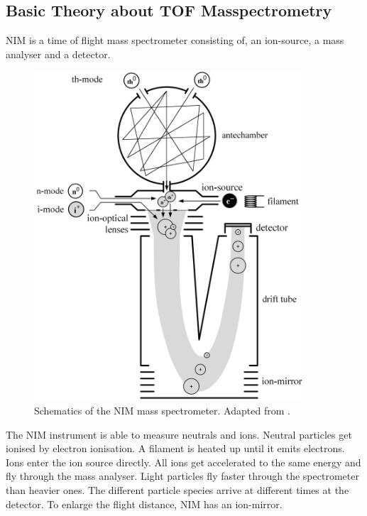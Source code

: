 	\subsection{Basic Theory about TOF Masspectrometry} %
	NIM is a time of flight mass spectrometer consisting of, an ion-source, a mass analyser and a detector.\\
	\begin{figure}[htb]
		\centering
		\includegraphics[width= 10cm]{Bilder/NIM_Sketch.png}
		\caption{Schematics of the NIM mass spectrometer. Adapted from \cite{Diss_Meyer}.}
		\label{fig:NIMSketch}
	\end{figure}
	The NIM instrument is able to measure neutrals and ions. Neutral particles get ionised by electron ionisation. A filament is heated up until it emits electrons. Ions enter the ion source directly. All ions get accelerated to the same energy and fly through the mass analyser. Light particles fly faster through the spectrometer than heavier ones. The different particle species arrive at different times at the detector. To enlarge the flight distance, NIM has an ion-mirror. %
	

